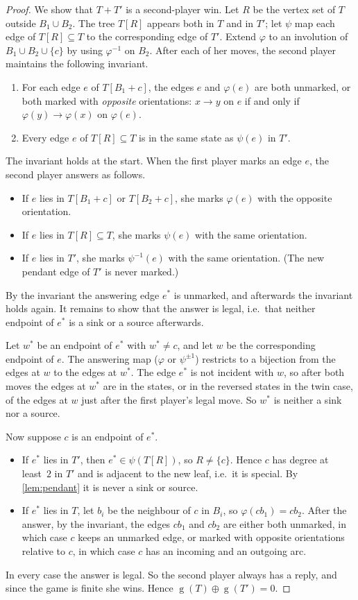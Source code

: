 \documentclass[11pt]{amsart}
\theoremstyle{definition}
\theoremstyle{remark}
\newcommand{\gv}{\operatorname{g}}           %
\begin{document}
\begin{proof}
We show that $T+T'$ is a second-player win. Let $R$ be the vertex set of $T$ outside $B_1\cup B_2$. The tree $T[R]$ appears both in $T$ and in $T'$; let $\psi$ map each edge of $T[R]\subseteq T$ to the corresponding edge of $T'$. Extend $\varphi$ to an involution of $B_1\cup B_2\cup\{c\}$ by using $\varphi^{-1}$ on $B_2$. After each of her moves, the second player maintains the following invariant.
\begin{enumerate}[label=(\arabic*)]
\item For each edge $e$ of $T[B_1+c]$, the edges $e$ and $\varphi(e)$ are both unmarked, or both marked with \emph{opposite} orientations: $x\to y$ on $e$ if and only if $\varphi(y)\to\varphi(x)$ on $\varphi(e)$.
\item Every edge $e$ of $T[R]\subseteq T$ is in the same state as $\psi(e)$ in $T'$.
\end{enumerate}
The invariant holds at the start. When the first player marks an edge $e$, the second player answers as follows.
\begin{itemize}[leftmargin=*]
\item If $e$ lies in $T[B_1+c]$ or $T[B_2+c]$, she marks $\varphi(e)$ with the opposite orientation.
\item If $e$ lies in $T[R]\subseteq T$, she marks $\psi(e)$ with the same orientation.
\item If $e$ lies in $T'$, she marks $\psi^{-1}(e)$ with the same orientation. (The new pendant edge of $T'$ is never marked.)
\end{itemize}
By the invariant the answering edge $e^*$ is unmarked, and afterwards the invariant holds again. It remains to show that the answer is legal, i.e.\ that neither endpoint of $e^*$ is a sink or a source afterwards.

Let $w^*$ be an endpoint of $e^*$ with $w^*\ne c$, and let $w$ be the corresponding endpoint of $e$. The answering map ($\varphi$ or $\psi^{\pm1}$) restricts to a bijection from the edges at $w$ to the edges at $w^*$. The edge $e^*$ is not incident with $w$, so after both moves the edges at $w^*$ are in the states, or in the reversed states in the twin case, of the edges at $w$ just after the first player's legal move. So $w^*$ is neither a sink nor a source.

Now suppose $c$ is an endpoint of $e^*$.
\begin{itemize}[leftmargin=*]
\item If $e^*$ lies in $T'$, then $e^*\in\psi(T[R])$, so $R\ne\{c\}$. Hence $c$ has degree at least~$2$ in $T'$ and is adjacent to the new leaf, i.e.\ it is special. By \cref{lem:pendant} it is never a sink or source.
\item If $e^*$ lies in $T$, let $b_i$ be the neighbour of $c$ in $B_i$, so $\varphi(cb_1)=cb_2$. After the answer, by the invariant, the edges $cb_1$ and $cb_2$ are either both unmarked, in which case $c$ keeps an unmarked edge, or marked with opposite orientations relative to $c$, in which case $c$ has an incoming and an outgoing arc.
\end{itemize}
In every case the answer is legal. So the second player always has a reply, and since the game is finite she wins. Hence $\gv(T)\oplus\gv(T')=0$.


\end{proof}
\end{document}
